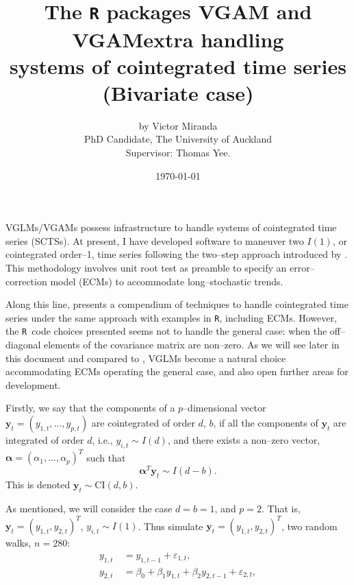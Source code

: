 \documentclass[a4paper, 11pt]{article}\usepackage[]{graphicx}\usepackage[]{color}
\title{ The {\color{blue} \texttt{R}} packages
{\color{cyan} \textsf{VGAM}} and 
{\color{cyan} \textsf{VGAMextra}} handling \\
systems of cointegrated time series (Bivariate case)}
\author{by Victor Miranda\\
{\small PhD Candidate, The University of Auckland}\\
\small{Supervisor: Thomas Yee.}}
\date{\today}
\newcommand{\Rcol}{{\color{blue} {\large \texttt{R}}}~}
\begin{document}
\maketitle
\vspace{-5mm}
\noindent
VGLMs/VGAMs possess infrastructure to handle
      systems of 
      {\color{red} cointegrated} time series (SCTSs).
      At present, I have developed software to maneuver 
      two $I(1)$, or cointegrated order--1, time series following
      the two--step approach introduced by \cite{engl:gran:1987}.
      This methodology involves unit root test as preamble
      to specify an error--correction model (ECMs) to 
      accommodate long--stochastic trends.
      
      \vspace{2mm}
      Along this line, 
      \cite{pfaf:2011} presents a compendium 
of techniques to handle cointegrated time series
under the same approach
with examples in {\color{blue} \texttt{R}}, including ECMs.
However, the \Rcol code choices presented seems not to
handle the general case:
when the off--diagonal elements of the covariance matrix are non--zero.
As we will see later in this document and compared to 
\cite{pfaf:2011}, VGLMs become a natural choice accommodating
ECMs operating the general case,
and also open further areas for development.

\vspace{2mm}
Firstly, we say that the components of a $p$--dimensional
vector
$\boldsymbol{y}_t = (y_{1, t}, \ldots, y_{p, t})$
are cointegrated of order $d$, $b$, if all
the components of $\boldsymbol{y}_t$ are integrated of order
$d$, i.e., $y_{i, t} \sim I(d)$, and there exists a non--zero vector,
$\boldsymbol{\alpha} = (\alpha_1, \ldots, \alpha_p)^T$ such that 
\begin{equation}\label{eq:one}
\boldsymbol{\alpha}^T \boldsymbol{y}_t \sim I(d - b).
\end{equation}
This is denoted $\boldsymbol{y}_t \sim \textrm{CI}(d, b)$.

\vspace{2mm}
As mentioned, we will consider the case $d = b = 1$, and 
$p = 2$. That is, $\boldsymbol{y}_t = (y_{1, t}, y_{2, t})^T$,
$y_{i, t} \sim I(1)$.
Thus simulate
{\color{darkblue}$\mathbold{y}_t = 
 (y_{1, t}, y_{2, t})^T$},
 two {\color{red} random walks}, $n = 280$:
 {\color{darkblue}
 \begin{align} \label{sim:coint}
  y_{1, t} &~= y_{1, t - 1} + \varepsilon_{1, t}, \\
 \nonumber y_{2, t} &~= \beta_0 + \beta_1 y_{1, t} + 
    \beta_2 y_{2, t - 1} + \varepsilon_{2, t},
 \end{align}
}
 
\end{document}
